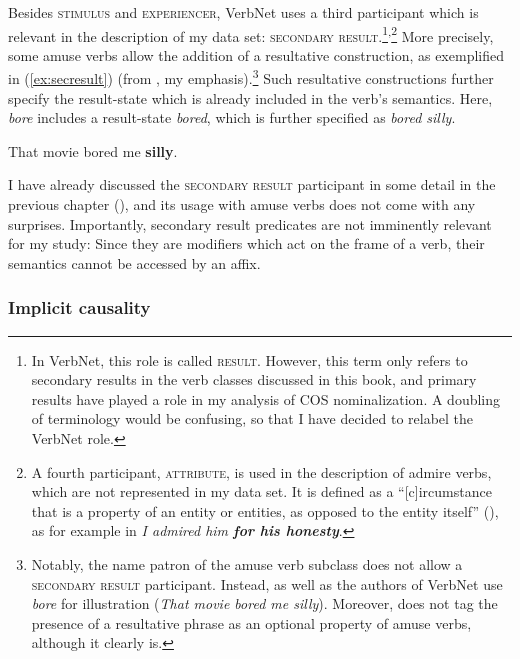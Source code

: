 \noindent Besides \textsc{stimulus} and \textsc{experiencer}, VerbNet uses a third participant which is relevant in the description of my data set: \textsc{secondary result}.\footnote{In VerbNet, this role is called \textsc{result}. However, this term only refers to secondary results in the verb classes discussed in this book, and primary results have played a role in my analysis of COS nominalization. A doubling of terminology would be confusing, so that I have decided to relabel the VerbNet role.}\textsuperscript{,}\footnote{A fourth participant, \textsc{attribute}, is used in the description of admire verbs, which are not represented in my data set. It is defined as a ``[c]ircumstance that is a property of an entity or entities, as opposed to the entity itself'' (\citealt[318]{Palmer.2017}), as for example in \textit{I admired him \textbf{for his honesty}}.} 
More precisely, some amuse verbs allow the addition of a resultative construction, as exemplified in (\ref{ex:secresult}) (from \citealt[190]{Levin.1993}, my emphasis).\footnote{Notably, the name patron of the amuse verb subclass does not allow a \textsc{secondary result} participant. Instead, \citet{Levin.1993} as well as the authors of VerbNet use \textit{bore} for illustration (\textit{That movie bored me silly}). Moreover, \citet{Levin.1993} does not tag the presence of a resultative phrase as an optional property of amuse verbs, although it clearly is.} Such resultative constructions further specify the result-state which is already included in the verb's semantics. Here, \textit{bore} includes a result-state \textit{bored}, which is further specified as \textit{bored silly}.

\begin{exe}
  \ex \label{ex:secresult} That movie bored me \textbf{silly}.
\end{exe} 

\noindent I have already discussed the \textsc{secondary result} participant in some detail in the previous chapter (), and its usage with amuse verbs does not come with any surprises. Importantly, secondary result predicates are not imminently relevant for my study: Since they are modifiers which act on the frame of a verb, their semantics cannot be accessed by an affix.



\subsubsection{Implicit causality}
\label{sec:psy-input-prev-impl}

